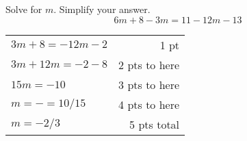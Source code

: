 
{
	Solve for $m$. Simplify your answer. $$6m+8-3m=11-12m-13$$
}
{
	\begin{tabular}{l r}
	$3m+8=-12m-2$ & 1 pt\\
	$3m+12m=-2-8$ & 2 pts to here\\
	$15m=-10$ & 3 pts to here\\
	$m=-=10/15$ & 4 pts to here\\
	$m=-2/3$ & 5 pts total
	\end{tabular}
}
